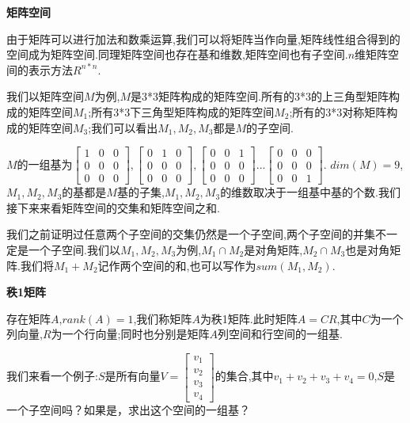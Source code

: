 \documentclass[oneside]{book}
\begin{document}
	\textbf{矩阵空间}
	
	由于矩阵可以进行加法和数乘运算,我们可以将矩阵当作向量,矩阵线性组合得到的空间成为矩阵空间.同理矩阵空间也存在基和维数,矩阵空间也有子空间.\qquad $n$维矩阵空间的表示方法$R^{n*n}$.
	
	我们以矩阵空间$M$为例,$M$是3*3矩阵构成的矩阵空间.所有的3*3的上三角型矩阵构成的矩阵空间$M_{1}$;所有3*3下三角型矩阵构成的矩阵空间$M_{2}$;所有的3*3对称矩阵构成的矩阵空间$M_{3}$;我们可以看出$M_{1},M_{2},M_{3}$都是$M$的子空间.
	
	$M$的一组基为$\left[\begin{array}{ccc}
		1&0&0\\0&0&0\\0&0&0
	\end{array}\right],\left[\begin{array}{ccc}
	0&1&0\\0&0&0\\0&0&0
\end{array}\right],\left[\begin{array}{ccc}
0&0&1\\0&0&0\\0&0&0
\end{array}\right]...\left[\begin{array}{ccc}
0&0&0\\0&0&0\\0&0&1
\end{array}\right]$.
$dim(M)=9$,$M_{1},M_{2},M_{3}$的基都是$M$基的子集,$M_{1},M_{2},M_{3}$的维数取决于一组基中基的个数.我们接下来来看矩阵空间的交集和矩阵空间之和.

我们之前证明过任意两个子空间的交集仍然是一个子空间,两个子空间的并集不一定是一个子空间.我们以$M_{1},M_{2},M_{3}$为例,$M_{1}\cap M_{2}$是对角矩阵,$M_{2}\cap M_{3}$也是对角矩阵.我们将$M_{1}+M_{2}$记作两个空间的和,也可以写作为$sum(M_{1},M_{2})$.

\textbf{秩1矩阵}

存在矩阵$A$,$rank(A)=1$,我们称矩阵$A$为秩1矩阵.此时矩阵$A=CR$,其中$C$为一个列向量,$R$为一个行向量;同时也分别是矩阵$A$列空间和行空间的一组基.

我们来看一个例子:$S$是所有向量$V=\left[\begin{array}{c}
	v_{1}\\v_{2}\\v_{3}\\v_{4}
\end{array}\right]$的集合,其中$v_{1}+v_{2}+v_{3}+v_{4}=0$,$S$是一个子空间吗？如果是，求出这个空间的一组基？
\end{document}

